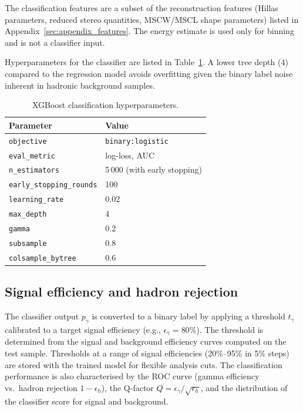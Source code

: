 \documentclass[12pt]{article}
\begin{document}
The classification features are a subset of the reconstruction features
(Hillas parameters, reduced stereo quantities, MSCW/MSCL shape parameters)
listed in Appendix~\ref{sec:appendix_features}.
The energy estimate is used only for binning and is not a classifier input.

Hyperparameters for the classifier are listed in Table~\ref{tab:hyperparameters_cls}.
A lower tree depth (4) compared to the regression model avoids overfitting given the
binary label noise inherent in hadronic background samples.

\begin{table}[h]
\centering
\caption{XGBoost classification hyperparameters.}
\label{tab:hyperparameters_cls}
\begin{tabular}{ll}
\toprule
\textbf{Parameter} & \textbf{Value} \\
\midrule
\texttt{objective}           & \texttt{binary:logistic} \\
\texttt{eval\_metric}        & log-loss, AUC \\
\texttt{n\_estimators}       & 5\,000 (with early stopping) \\
\texttt{early\_stopping\_rounds} & 100 \\
\texttt{learning\_rate}      & 0.02 \\
\texttt{max\_depth}          & 4 \\
\texttt{gamma}               & 0.2 \\
\texttt{subsample}           & 0.8 \\
\texttt{colsample\_bytree}   & 0.6 \\
\bottomrule
\end{tabular}
\end{table}

\subsection{Signal efficiency and hadron rejection}

The classifier output $p_\gamma$ is converted to a binary label by applying a
threshold $t_\gamma$ calibrated to a target signal efficiency
(e.g., $\epsilon_\gamma = 80\%$).
The threshold is determined from the signal and background efficiency curves
computed on the test sample.
Thresholds at a range of signal efficiencies (20\%--95\% in 5\% steps) are
stored with the trained model for flexible analysis cuts.
The classification performance is also characterised by the ROC curve
(gamma efficiency vs.\ hadron rejection $1 - \epsilon_h$),
the Q-factor $Q = \epsilon_\gamma / \sqrt{\epsilon_h}$,
and the distribution of the classifier score for signal and background.
\end{document}
